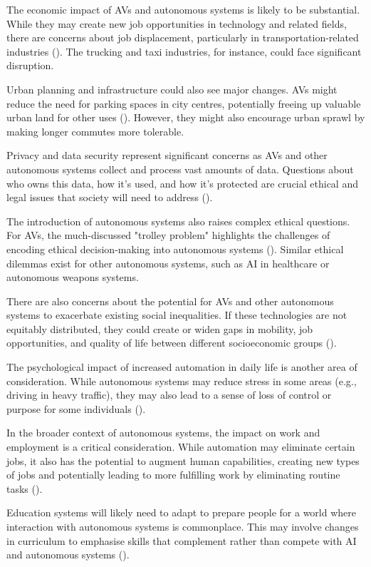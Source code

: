 The economic impact of AVs and autonomous systems is likely to be substantial. While they may create new job opportunities in technology and related fields, there are concerns about job displacement, particularly in transportation-related industries (\cite{Autor2015}). The trucking and taxi industries, for instance, could face significant disruption.

Urban planning and infrastructure could also see major changes. AVs might reduce the need for parking spaces in city centres, potentially freeing up valuable urban land for other uses (\cite{Duarte2018}). However, they might also encourage urban sprawl by making longer commutes more tolerable.

Privacy and data security represent significant concerns as AVs and other autonomous systems collect and process vast amounts of data. Questions about who owns this data, how it's used, and how it's protected are crucial ethical and legal issues that society will need to address (\cite{Taeihagh2019}).

The introduction of autonomous systems also raises complex ethical questions. For AVs, the much-discussed "trolley problem" highlights the challenges of encoding ethical decision-making into autonomous systems (\cite{Awad2018}). Similar ethical dilemmas exist for other autonomous systems, such as AI in healthcare or autonomous weapons systems.

There are also concerns about the potential for AVs and other autonomous systems to exacerbate existing social inequalities. If these technologies are not equitably distributed, they could create or widen gaps in mobility, job opportunities, and quality of life between different socioeconomic groups (\cite{Milakis2017}).

The psychological impact of increased automation in daily life is another area of consideration. While autonomous systems may reduce stress in some areas (e.g., driving in heavy traffic), they may also lead to a sense of loss of control or purpose for some individuals (\cite{Hancock2020}).

In the broader context of autonomous systems, the impact on work and employment is a critical consideration. While automation may eliminate certain jobs, it also has the potential to augment human capabilities, creating new types of jobs and potentially leading to more fulfilling work by eliminating routine tasks (\cite{Autor2015}).

Education systems will likely need to adapt to prepare people for a world where interaction with autonomous systems is commonplace. This may involve changes in curriculum to emphasise skills that complement rather than compete with AI and autonomous systems (\cite{Manyika2017}).

